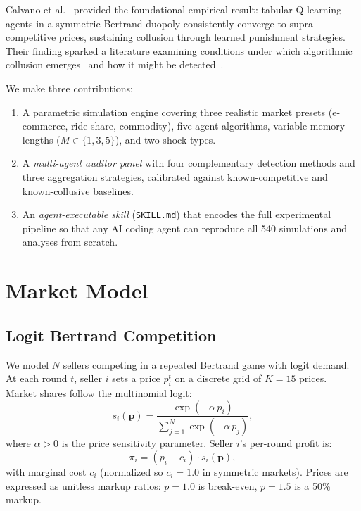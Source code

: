 \documentclass[11pt]{article}
\begin{document}
Calvano et al.~\cite{calvano2020artificial} provided the foundational empirical result: tabular Q-learning agents in a symmetric Bertrand duopoly consistently converge to supra-competitive prices, sustaining collusion through learned punishment strategies.
Their finding sparked a literature examining conditions under which algorithmic collusion emerges~\cite{klein2021autonomous,banchio2022artificial} and how it might be detected~\cite{brown2023competition}.

We make three contributions:
\begin{enumerate}
  \item A parametric simulation engine covering three realistic market presets (e-commerce, ride-share, commodity), five agent algorithms, variable memory lengths ($M \in \{1, 3, 5\}$), and two shock types.
  \item A \emph{multi-agent auditor panel} with four complementary detection methods and three aggregation strategies, calibrated against known-competitive and known-collusive baselines.
  \item An \emph{agent-executable skill} (\texttt{SKILL.md}) that encodes the full experimental pipeline so that any AI coding agent can reproduce all 540 simulations and analyses from scratch.
\end{enumerate}

\section{Market Model}

\subsection{Logit Bertrand Competition}

We model $N$ sellers competing in a repeated Bertrand game with logit demand.
At each round $t$, seller $i$ sets a price $p_i^t$ on a discrete grid of $K = 15$ prices.
Market shares follow the multinomial logit:
\begin{equation}
  s_i(\mathbf{p}) = \frac{\exp(-\alpha \, p_i)}{\sum_{j=1}^{N} \exp(-\alpha \, p_j)},
  \label{eq:logit}
\end{equation}
where $\alpha > 0$ is the price sensitivity parameter.
Seller $i$'s per-round profit is:
\begin{equation}
  \pi_i = (p_i - c_i) \cdot s_i(\mathbf{p}),
\end{equation}
with marginal cost $c_i$ (normalized so $c_i = 1.0$ in symmetric markets).
Prices are expressed as unitless markup ratios: $p = 1.0$ is break-even, $p = 1.5$ is a 50\% markup.
\end{document}
